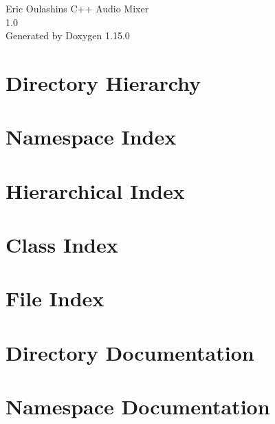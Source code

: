 \documentclass[twoside]{book}
\newcommand{\+}{\discretionary{\mbox{\scriptsize$\hookleftarrow$}}{}{}}
\newcommand{\clearemptydoublepage}{%
    \newpage{\pagestyle{empty}\cleardoublepage}%
  }
\begin{document}
  \raggedbottom
  \begin{titlepage}
  \vspace*{7cm}
  \begin{center}%
  {\Large Eric Oulashin\textquotesingle{}s C++ Audio Mixer}\\
  [1ex]\large 1.\+0 \\
  \vspace*{1cm}
  {\large Generated by Doxygen 1.15.0}\\
  \end{center}
  \end{titlepage}
  \clearemptydoublepage
  \tableofcontents
  \clearemptydoublepage

\chapter{Directory Hierarchy}

\chapter{Namespace Index}

\chapter{Hierarchical Index}

\chapter{Class Index}

\chapter{File Index}

\chapter{Directory Documentation}







\chapter{Namespace Documentation}


\end{document}
